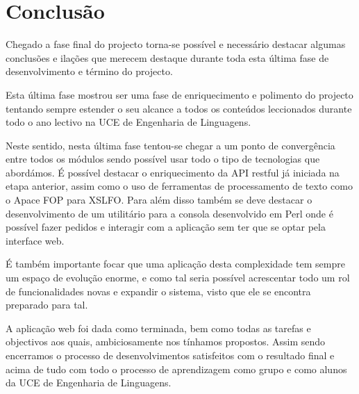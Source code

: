 \section{Conclusão}
Chegado a fase final do projecto torna-se possível e necessário destacar algumas conclusões e ilações que merecem destaque durante toda esta última fase de desenvolvimento e término do projecto.

Esta última fase mostrou ser uma fase de enriquecimento e polimento do projecto tentando sempre estender o seu alcance a todos os conteúdos leccionados durante todo o ano lectivo na UCE de Engenharia de Linguagens.

Neste sentido, nesta última fase tentou-se chegar a um ponto de convergência entre todos os módulos sendo possível usar todo o tipo de tecnologias que abordámos. É possível destacar o enriquecimento da API restful já iniciada na etapa anterior, assim como o uso de ferramentas de processamento de texto como o Apace FOP para XSLFO. Para além disso também se deve destacar o desenvolvimento de um utilitário para a consola desenvolvido em Perl onde é possível fazer pedidos e interagir com a aplicação sem ter que se optar pela interface web.

É também importante focar que uma aplicação desta complexidade tem sempre um espaço de evolução enorme, e como tal seria possível acrescentar todo um rol de funcionalidades novas e expandir o sistema, visto que ele se encontra preparado para tal.

A aplicação web foi dada como terminada, bem como todas as tarefas e objectivos aos quais, ambiciosamente nos tínhamos propostos. Assim sendo encerramos o processo de desenvolvimentos satisfeitos com o resultado final e acima de tudo com todo o processo de aprendizagem como grupo e como alunos da UCE de Engenharia de Linguagens.

\newpage
